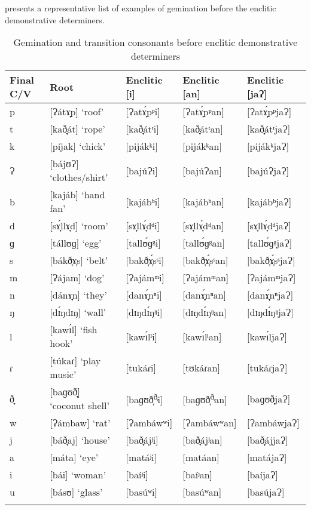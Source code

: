  presents a representative list of examples of gemination before the enclitic demonstrative determiners.


\begin{table}
\caption{Gemination and transition consonants before enclitic demonstrative determiners}
\label{tab2.12}
\begin{tabularx}{\textwidth}{lQQQQ}
\lsptoprule
Final C/V & Root & Enclitic [i] & Enclitic [an] & Enclitic [jaɁ] \\
\midrule
p & [Ɂátɤ̞p] ‘roof’ & [Ɂatɤ̞́pᵖi] & [Ɂatɤ̞́pᵖan] & [Ɂatɤ̞́pᵖjaɁ] \\
t & [kað̞át] ‘rope’ & [kað̞átᵗi] & [kað̞átᵗan] & [kað̞átᵗjaɁ] \\
k & [píjak] ‘chick’ & [pijákᵏi] & [pijákᵏan] & [pijákᵏjaɁ] \\
Ɂ & [bájʊɁ] ‘clothes/shirt’ & [bajúɁi] & [bajúɁan] & [bajúɁjaɁ] \\
b & [kajáb] ‘hand fan’ & [kajábᵇi] & [kajábᵇan] & [kajábᵇjaɁ] \\
d & [sɤ̞́llɤ̞d] ‘room’ & [sɤ̞llɤ̞́dᵈi] & [sɤ̞llɤ̞́dᵈan] & [sɤ̞llɤ̞́dᵈjaɁ] \\
ɡ & [tállʊɡ] ‘egg’ & [tallʊ́ɡᵍi] & [tallʊ́ɡᵍan] & [tallʊ́ɡᵍjaɁ] \\
s & [bákð̞ɤ̞s] ‘belt’ & [bakð̞ɤ̞́sˢi] & [bakð̞ɤ̞́sˢan] & [bakð̞ɤ̞́sˢjaɁ] \\
m & [Ɂájam] ‘dog’ & [Ɂajámᵐi] & [Ɂajámᵐan] & [ɁajámᵐjaɁ] \\
n & [dánɤ̞n] ‘they’ & [danɤ̞́nⁿi] & [danɤ̞́nⁿan] & [danɤ̞́nⁿjaɁ] \\
ŋ & [dɪ́ŋdɪŋ] ‘wall’ & [dɪŋdɪ́ŋᵑi] & [dɪŋdɪ́ŋᵑan] & [dɪŋdɪ́ŋᵑjaɁ] \\
l & [kawɪ́l] ‘fish hook’ & [kawɪ́lˡi] & [kawɪ́lˡan] & [kawɪ́ljaɁ] \\
ɾ & [túkaɾ] ‘play music’ & [tukáɾi] & [tʊkáɾan] & [tukáɾjaɁ] \\
ð̞ & [baɡʊð̞] ‘coconut shell’ & [baɡʊð̞\textsuperscript{ð̞}i] & [baɡʊð̞\textsuperscript{ð̞}an] & [baɡʊð̞jaɁ] \\
w & [Ɂámbaw] ‘rat’ & [Ɂambáwʷi] & [Ɂambáwʷan] & [ɁambáwjaɁ] \\
j & [báð̞aj] ‘house’ & [bað̞ájʲi] & [bað̞ájʲan] & [bað̞ájjaɁ] \\
a & [máta] ‘eye’ & [matáʲi] & [matáan] & [matájaɁ] \\
i & [bái] ‘woman’ & [baíʲi] & [baíʲan] & [baíjaɁ] \\
u & [básʊ] ‘glass’ & [basúʷi] & [basúʷan] & [basújaɁ] \\
\lspbottomrule
\end{tabularx}
\end{table}

